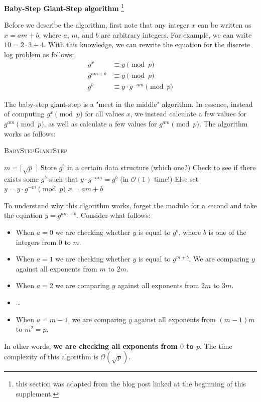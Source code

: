 \documentclass{article}
\begin{document}
    \begin{center}
        \textbf{Baby-Step Giant-Step algorithm}
        \footnote{this section was adapted from the blog post linked at the beginning of this supplement.}
    \end{center}

    Before we describe the algorithm, first note that any integer $x$ can be written as $x = am + b$, where $a$, $m$, and $b$ are arbitrary integers. For example, we can write $10 = 2 \cdot 3 + 4$. With this knowledge, we can rewrite the equation for the discrete log problem as follows:
    \begin{align*}
        g^{x} &\equiv y \pmod{p} \\
        g^{am + b} &\equiv y\pmod{p} \\
        g^{b} &\equiv y \cdot g^{-am} \pmod{p}
     \end{align*}

     The baby-step giant-step is a "meet in the middle" algorithm. In essence, instead of computing $g^{x} \pmod{p}$ for all values $x$, we instead calculate a few values for $g^{am} \pmod{p}$, as well as calculate a few values for $g^{am} \pmod{p}$. The algorithm works as follows:

     \begin{algorithm}
        \caption{\textsc{BabyStepGiantStep}}
        \label{alg:bsgs}
        \begin{algorithmic}
            \State $m = \lceil \sqrt{p}\ \rceil$
                \State Store $g^{b}$ in a certain data structure (which one?)
            \EndFor
                \State Check to see if there exists some $g^{b}$ such that $y \cdot g^{-am} = g^{b}$ (in $\mathcal{O}(1)$ time!)
                \State Else set $y = y \cdot g^{-m} \pmod{p}$
            \EndFor
            \Return $x = am + b$
        \end{algorithmic}
    \end{algorithm}
    To understand why this algorithm works, forget the modulo for a second and take the equation $y = g^{am + b}$. Consider what follows:
    \begin{itemize}
        \item When $a = 0$ we are checking whether $y$ is equal to $g^{b}$, where $b$ is one of the integers from $0$ to $m$.
        \item When $a = 1$ we are checking whether $y$ is equal to $g^{m + b}$. We are comparing $y$ against all exponents from $m$ to $2m$.
        \item When $a = 2$ we are comparing $y$ against all exponents from $2m$ to $3m$.
        \item \dots
        \item When $a = m - 1$, we are comparing $y$ against all exponents from $(m - 1)m$ to $m^{2} = p$.
    \end{itemize}
    In other words, \textbf{we are checking all exponents from $0$ to $p$}. The time complexity of this algorithm is $\mathcal{O}(\sqrt{p})$.
    
\end{document}
